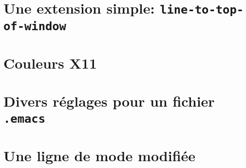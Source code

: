 \section{Une extension simple:
  \texttt{line-to-top-of-window}}

\section{Couleurs X11}

\section{Divers réglages pour un fichier
  \texttt{.emacs}}

\section{Une ligne de mode modifiée}

